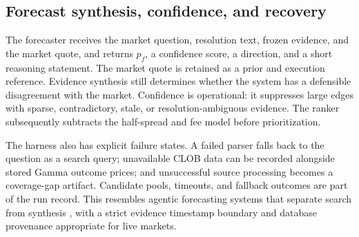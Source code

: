 \subsection{Forecast synthesis, confidence, and recovery}

The forecaster receives the market question, resolution text, frozen evidence, and the market quote, and returns $p_f$, a confidence score, a direction, and a short reasoning statement. The market quote is retained as a prior and execution reference. Evidence synthesis still determines whether the system has a defensible disagreement with the market. Confidence is operational: it suppresses large edges with sparse, contradictory, stale, or resolution-ambiguous evidence. The ranker subsequently subtracts the half-spread and fee model before prioritization.

The harness also has explicit failure states. A failed parser falls back to the question as a search query; unavailable CLOB data can be recorded alongside stored Gamma outcome prices; and unsuccessful source processing becomes a coverage-gap artifact. Candidate pools, timeouts, and fallback outcomes are part of the run record. This resembles agentic forecasting systems that separate search from synthesis \citep{aiaforecaster2025}, with a strict evidence timestamp boundary and database provenance appropriate for live markets.
